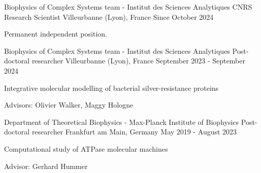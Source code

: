 \def \cvvertspace {2.00mm}

\begin{cventries}
\cventry
    {Biophysics of Complex Systems team - Institut des Sciences Analytiques}
    {CNRS Research Scientist}
    {Villeurbanne (Lyon), France}
    {Since October 2024}
    {
        \begin{cvitems}
            \item Permanent independent position.
            \vspace{\cvvertspace}
        \end{cvitems}
}
\end{cventries}

\begin{cventries}

    \cventry
    {Biophysics of Complex Systems team - Institut des Sciences Analytiques}
    {Post-doctoral researcher}
    {Villeurbanne (Lyon), France}
    {September 2023 - September 2024}
    {
        \begin{cvitems}
            \item Integrative molecular modelling of bacterial silver-resistance proteins
            \item Advisors: Olivier Walker, Maggy Hologne
            \vspace{\cvvertspace}
        \end{cvitems}
}
    \cventry
    {Department of Theoretical Biophysics - Max-Planck Institute of Biophysics}
    {Post-doctoral researcher}
    {Frankfurt am Main, Germany}
    {May 2019 - August 2023}
    {
        \begin{cvitems}
            \item Computational study of ATPase molecular machines
            \item Advisor: Gerhard Hummer
            \vspace{\cvvertspace}
        \end{cvitems}
}


\end{cventries}
